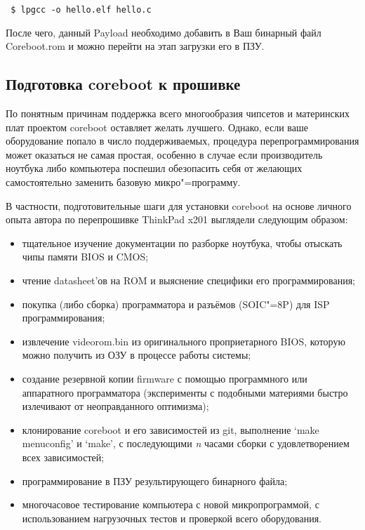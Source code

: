 \documentclass[10pt, a5paper]{article}
\begin{document}
\verb! $ lpgcc -o hello.elf hello.c!

После чего, данный Payload необходимо добавить в Ваш бинарный файл Coreboot.rom и можно перейти на этап загрузки его в ПЗУ.

\subsection*{Подготовка coreboot к прошивке}

По понятным причинам поддержка всего многообразия чипсетов и материнских плат проектом coreboot оставляет желать лучшего. Однако, если ваше оборудование попало в число поддерживаемых, процедура перепрограммирования может оказаться не самая простая, особенно в случае если производитель ноутбука либо компьютера поспешил обезопасить себя от желающих самостоятельно заменить базовую микро"=программу.

В частности, подготовительные шаги для установки coreboot на основе личного опыта автора по перепрошивке ThinkPad x201\cite {bib4} выглядели следующим образом:

\begin{itemize}
  \item тщательное изучение документации по разборке ноутбука, чтобы отыскать чипы памяти BIOS и CMOS;
  \item чтение datasheet'ов на ROM и выяснение специфики его программирования;
  \item покупка (либо сборка) программатора и разъёмов (SOIC"=8P) для ISP программирования;
  \item извлечение videorom.bin из оригинального проприетарного \linebreak BIOS, которую можно получить из ОЗУ в процессе работы системы;
  \item создание резервной копии firmware с помощью программного или аппаратного программатора (эксперименты с подобными материями быстро излечивают от неоправданного оптимизма);
  \item клонирование coreboot и его зависимостей из git, выполнение `make menuconfig' и `make', с последующими \emph{n} часами сборки с удовлетворением всех зависимостей;
  \item программирование в ПЗУ результирующего бинарного файла;
  \item многочасовое тестирование компьютера с новой микропро\-граммой, с использованием нагрузочных тестов и проверкой всего оборудования.
\end{itemize}
\end{document}
